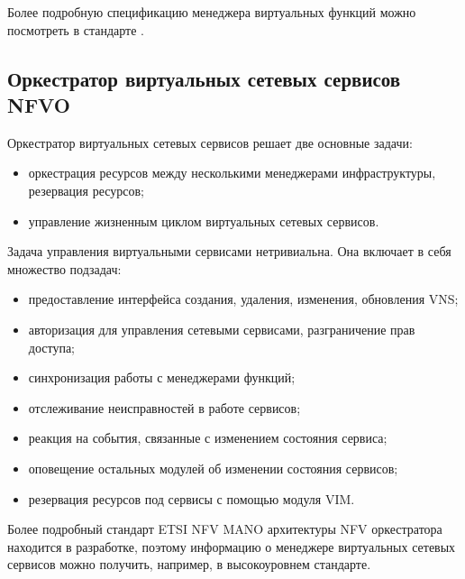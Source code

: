 \documentclass[oneside,final,14pt,a4paper]{extreport}
\begin{document}
Более подробную спецификацию менеджера виртуальных функций можно посмотреть в стандарте \cite{nfv-mano-official-2016-04}.

\subsection{Оркестратор виртуальных сетевых сервисов NFVO}
Оркестратор виртуальных сетевых сервисов решает две основные задачи:
\begin{itemize}
	\item оркестрация ресурсов между несколькими менеджерами инфраструктуры, резервация ресурсов;
	\item управление жизненным циклом виртуальных сетевых сервисов.
\end{itemize}

Задача управления виртуальными сервисами нетривиальна. Она включает в себя множество подзадач:

\begin{itemize}
	\item предоставление интерфейса создания, удаления, изменения, обновления VNS;
	\item авторизация для управления сетевыми сервисами, разграничение прав доступа;
	\item синхронизация работы с менеджерами функций;
	\item отслеживание неисправностей в работе сервисов;
	\item реакция на события, связанные с изменением состояния сервиса;
	\item оповещение остальных модулей об изменении состояния сервисов;
	\item резервация ресурсов под сервисы с помощью модуля VIM.
\end{itemize}

Более подробный стандарт ETSI NFV MANO архитектуры NFV оркестратора находится в разработке, поэтому информацию о менеджере виртуальных сетевых сервисов можно получить, например, в высокоуровнем стандарте.\cite{nfv-mano-official-2016-04}
\end{document}
